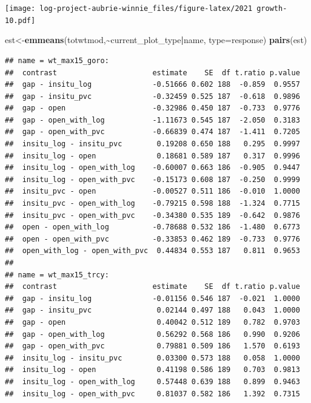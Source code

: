 \documentclass[
]{article}
\newenvironment{Shaded}{\begin{snugshade}}{\end{snugshade}}
\newcommand{\AttributeTok}[1]{\textcolor[rgb]{0.13,0.29,0.53}{#1}}
\newcommand{\FunctionTok}[1]{\textcolor[rgb]{0.13,0.29,0.53}{\textbf{#1}}}
\newcommand{\NormalTok}[1]{#1}
\newcommand{\OtherTok}[1]{\textcolor[rgb]{0.56,0.35,0.01}{#1}}
\newcommand{\SpecialCharTok}[1]{\textcolor[rgb]{0.81,0.36,0.00}{\textbf{#1}}}
\newcommand{\StringTok}[1]{\textcolor[rgb]{0.31,0.60,0.02}{#1}}
\begin{document}
\texttt{[image: log-project-aubrie-winnie\_files/figure-latex/2021 growth-10.pdf]}

\begin{Shaded}
\begin{Highlighting}[]
\NormalTok{est}\OtherTok{\textless{}{-}}\FunctionTok{emmeans}\NormalTok{(totwtmod,}\SpecialCharTok{\textasciitilde{}}\NormalTok{current\_plot\_type}\SpecialCharTok{|}\NormalTok{name, }\AttributeTok{type=}\StringTok{\textquotesingle{}response\textquotesingle{}}\NormalTok{)}
\FunctionTok{pairs}\NormalTok{(est)}
\end{Highlighting}
\end{Shaded}

\begin{verbatim}
## name = wt_max15_goro:
##  contrast                      estimate    SE  df t.ratio p.value
##  gap - insitu_log              -0.51666 0.602 188  -0.859  0.9557
##  gap - insitu_pvc              -0.32459 0.525 187  -0.618  0.9896
##  gap - open                    -0.32986 0.450 187  -0.733  0.9776
##  gap - open_with_log           -1.11673 0.545 187  -2.050  0.3183
##  gap - open_with_pvc           -0.66839 0.474 187  -1.411  0.7205
##  insitu_log - insitu_pvc        0.19208 0.650 188   0.295  0.9997
##  insitu_log - open              0.18681 0.589 187   0.317  0.9996
##  insitu_log - open_with_log    -0.60007 0.663 186  -0.905  0.9447
##  insitu_log - open_with_pvc    -0.15173 0.608 187  -0.250  0.9999
##  insitu_pvc - open             -0.00527 0.511 186  -0.010  1.0000
##  insitu_pvc - open_with_log    -0.79215 0.598 188  -1.324  0.7715
##  insitu_pvc - open_with_pvc    -0.34380 0.535 189  -0.642  0.9876
##  open - open_with_log          -0.78688 0.532 186  -1.480  0.6773
##  open - open_with_pvc          -0.33853 0.462 189  -0.733  0.9776
##  open_with_log - open_with_pvc  0.44834 0.553 187   0.811  0.9653
## 
## name = wt_max15_trcy:
##  contrast                      estimate    SE  df t.ratio p.value
##  gap - insitu_log              -0.01156 0.546 187  -0.021  1.0000
##  gap - insitu_pvc               0.02144 0.497 188   0.043  1.0000
##  gap - open                     0.40042 0.512 189   0.782  0.9703
##  gap - open_with_log            0.56292 0.568 186   0.990  0.9206
##  gap - open_with_pvc            0.79881 0.509 186   1.570  0.6193
##  insitu_log - insitu_pvc        0.03300 0.573 188   0.058  1.0000
##  insitu_log - open              0.41198 0.586 189   0.703  0.9813
##  insitu_log - open_with_log     0.57448 0.639 188   0.899  0.9463
##  insitu_log - open_with_pvc     0.81037 0.582 186   1.392  0.7315

\end{verbatim}
\end{document}
